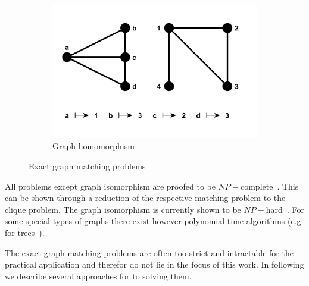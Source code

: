 \begin{figure}[h!]
\begin{subfigure}[b]{0.3\textwidth}
    \end{subfigure}
    ~
    \begin{subfigure}[b]{0.3\textwidth}
        \includegraphics[width=\textwidth]{chapter1/fig/homomorphism}
        \caption{Graph homomorphism}
        \label{fig:homomorphism}
    \end{subfigure}
    \caption[Exact graph matching problems]{Exact graph matching problems}\label{fig:Exact_GM}
\end{figure}

All problems except graph isomorphism are proofed to be $NP-$complete~\cite{Garey_NPComplet}. This can be shown through a reduction of the respective matching problem to the clique problem. The graph isomorphism is currently shown to be $NP-$hard~\cite{Garey_NPComplet,Schoening_GI}. For some special types of graphs there exist however polynomial time algorithms (e.g. for %
trees~\cite{Aho_Ullman, Garey_NPComplet}).

The exact graph matching problems are often too strict and intractable for the practical application and therefor do not lie in the focus of this work. In following we describe several approaches for to solving them.
